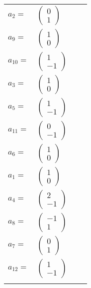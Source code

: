\documentclass[1p]{elsarticle_modified}
\theoremstyle{definition}
\begin{document}
\begin{tabular}{m{7pt} m{180pt} m{7pt} m{180pt} }
\flushright $a_{2}=$&$\begin{pmatrix}0\\1\end{pmatrix}$ \\
\flushright $a_{9}=$&$\begin{pmatrix}1\\0\end{pmatrix}$ \\
\flushright $a_{10}=$&$\begin{pmatrix}1\\-1\end{pmatrix}$ \\
\flushright $a_{3}=$&$\begin{pmatrix}1\\0\end{pmatrix}$ \\
\flushright $a_{5}=$&$\begin{pmatrix}1\\-1\end{pmatrix}$ \\
\flushright $a_{11}=$&$\begin{pmatrix}0\\-1\end{pmatrix}$ \\
\flushright $a_{6}=$&$\begin{pmatrix}1\\0\end{pmatrix}$ \\
\flushright $a_{1}=$&$\begin{pmatrix}1\\0\end{pmatrix}$ \\
\flushright $a_{4}=$&$\begin{pmatrix}2\\-1\end{pmatrix}$ \\
\flushright $a_{8}=$&$\begin{pmatrix}-1\\1\end{pmatrix}$ \\
\flushright $a_{7}=$&$\begin{pmatrix}0\\1\end{pmatrix}$ \\
\flushright $a_{12}=$&$\begin{pmatrix}1\\-1\end{pmatrix}$\\&\end{tabular}
\end{document}
